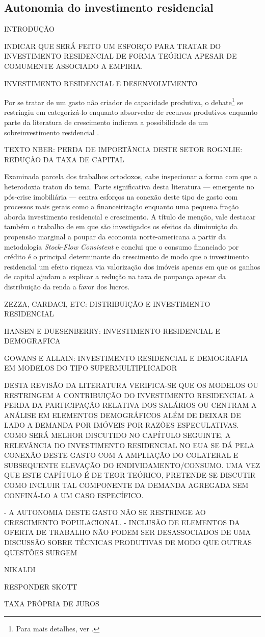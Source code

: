 \subsection{Autonomia do investimento residencial}
\label{RevResidencial}

INTRODUÇÃO

INDICAR QUE SERÁ FEITO UM ESFORÇO PARA TRATAR DO INVESTIMENTO RESIDENCIAL DE FORMA TEÓRICA APESAR DE COMUMENTE ASSOCIADO A EMPIRIA.


INVESTIMENTO RESIDENCIAL E DESENVOLVIMENTO

Por se tratar de um gasto não criador de capacidade produtiva, o debate\footnote{Para mais detalhes, ver \textcite{arku_housing_2006}.} se restringiu em categorizá-lo enquanto absorvedor de recursos produtivos \cite{solow_importance_1995} enquanto parte da literatura de crescimento indicava  a possibilidade de um sobreinvestimento residencial \cite{mills_has_1987}.

TEXTO NBER: PERDA DE IMPORTÂNCIA DESTE SETOR
ROGNLIE: REDUÇÃO DA TAXA DE CAPITAL

Examinada parcela dos trabalhos ortodoxos, cabe inspecionar a forma com que a heterodoxia tratou do tema. 
Parte significativa desta literatura  --- emergente no pós-crise imobiliária --- centra esforços na conexão deste tipo de gasto com processos mais gerais como a financeirização \cites{aalbers_financialization_2008}{bibow_financialization_2010} enquanto uma pequena fração aborda investimento residencial e crescimento.
A título de menção, vale destacar também o trabalho de \textcite{zezza_u.s._2008} em que são investigados os efeitos da diminuição da propensão marginal a poupar da economia norte-americana a partir da metodologia \textit{Stock-Flow Consistent} e conclui que o consumo financiado por crédito é o principal determinante do crescimento de modo que o investimento residencial um efeito riqueza via valorização dos imóveis apenas em que os ganhos de capital ajudam a explicar a redução na taxa de poupança apesar da distribuição da renda a favor dos lucros. 


ZEZZA, CARDACI, ETC: DISTRIBUIÇÃO E INVESTIMENTO RESIDENCIAL

HANSEN E DUESENBERRY: INVESTIMENTO RESIDENCIAL E DEMOGRAFICA

GOWANS E ALLAIN: INVESTIMENTO RESIDENCIAL E DEMOGRAFIA EM MODELOS DO TIPO SUPERMULTIPLICADOR

DESTA REVISÃO DA LITERATURA VERIFICA-SE QUE OS MODELOS OU RESTRINGEM A CONTRIBUIÇÃO DO INVESTIMENTO RESIDENCIAL A PERDA DA PARTICIPAÇÃO RELATIVA DOS SALÁRIOS OU CENTRAM A ANÁLISE EM ELEMENTOS DEMOGRÁFICOS ALÉM DE DEIXAR DE LADO A DEMANDA POR IMÓVEIS POR RAZÕES ESPECULATIVAS. COMO SERÁ MELHOR DISCUTIDO NO CAPÍTULO SEGUINTE, A RELEVÂNCIA DO INVESTIMENTO RESIDENCIAL NO EUA SE DÁ PELA CONEXÃO DESTE GASTO COM A AMPLIAÇÃO DO COLATERAL E SUBSEQUENTE ELEVAÇÃO DO ENDIVIDAMENTO/CONSUMO. UMA VEZ QUE ESTE CAPÍTULO É DE TEOR TEÓRICO, PRETENDE-SE DISCUTIR COMO INCLUIR TAL COMPONENTE DA DEMANDA AGREGADA SEM CONFINÁ-LO A UM CASO ESPECÍFICO.

- A AUTONOMIA DESTE GASTO NÃO SE RESTRINGE AO CRESCIMENTO POPULACIONAL.
- INCLUSÃO DE ELEMENTOS DA OFERTA DE TRABALHO NÃO PODEM SER DESASSOCIADOS DE UMA DISCUSSÃO SOBRE TÉCNICAS PRODUTIVAS DE MODO QUE OUTRAS QUESTÕES SURGEM

NIKALDI

RESPONDER SKOTT

TAXA PRÓPRIA DE JUROS
